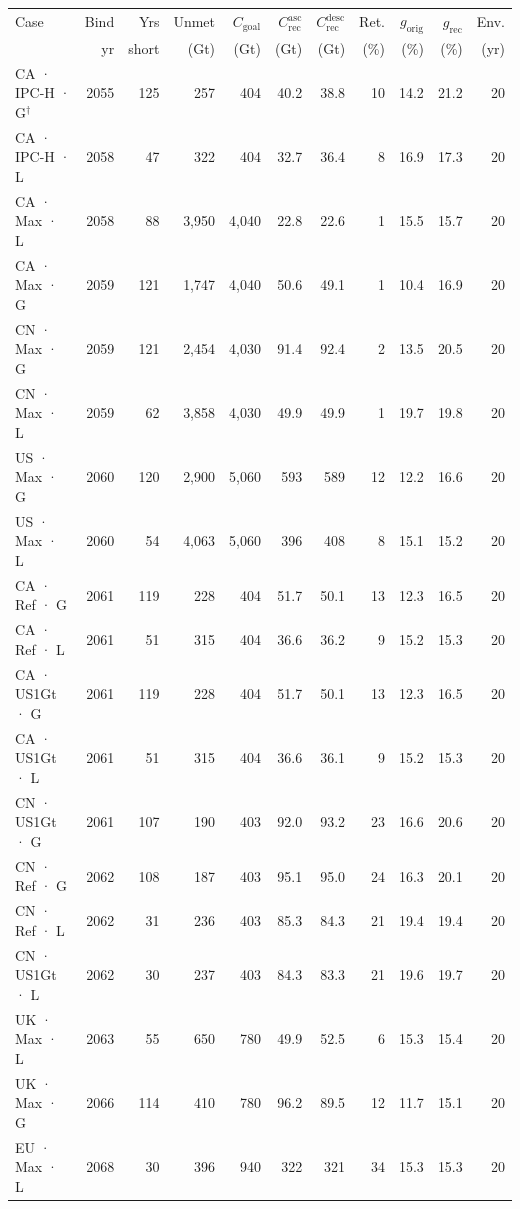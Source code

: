 \begin{tabular}{lrrrrrrrrrr}
Case & Bind & Yrs & Unmet & $C_{\mathrm{goal}}$ & $C_{\mathrm{rec}}^{\mathrm{asc}}$ & $C_{\mathrm{rec}}^{\mathrm{desc}}$ & Ret. & $g_{\mathrm{orig}}$ & $g_{\mathrm{rec}}$ & Env. \\
 & yr & short & (Gt) & (Gt) & (Gt) & (Gt) & (\%) & (\%) & (\%) & (yr) \\
\midrule
CA · IPC-H · G$^{\dagger}$ & 2055 & 125 & 257 & 404 & 40.2 & 38.8 & 10 & 14.2 & 21.2 & 20 \\
CA · IPC-H · L & 2058 & 47 & 322 & 404 & 32.7 & 36.4 & 8 & 16.9 & 17.3 & 20 \\
CA · Max · L & 2058 & 88 & 3,950 & 4,040 & 22.8 & 22.6 & 1 & 15.5 & 15.7 & 20 \\
CA · Max · G & 2059 & 121 & 1,747 & 4,040 & 50.6 & 49.1 & 1 & 10.4 & 16.9 & 20 \\
CN · Max · G & 2059 & 121 & 2,454 & 4,030 & 91.4 & 92.4 & 2 & 13.5 & 20.5 & 20 \\
CN · Max · L & 2059 & 62 & 3,858 & 4,030 & 49.9 & 49.9 & 1 & 19.7 & 19.8 & 20 \\
US · Max · G & 2060 & 120 & 2,900 & 5,060 & 593 & 589 & 12 & 12.2 & 16.6 & 20 \\
US · Max · L & 2060 & 54 & 4,063 & 5,060 & 396 & 408 & 8 & 15.1 & 15.2 & 20 \\
CA · Ref · G & 2061 & 119 & 228 & 404 & 51.7 & 50.1 & 13 & 12.3 & 16.5 & 20 \\
CA · Ref · L & 2061 & 51 & 315 & 404 & 36.6 & 36.2 & 9 & 15.2 & 15.3 & 20 \\
CA · US1Gt · G & 2061 & 119 & 228 & 404 & 51.7 & 50.1 & 13 & 12.3 & 16.5 & 20 \\
CA · US1Gt · L & 2061 & 51 & 315 & 404 & 36.6 & 36.1 & 9 & 15.2 & 15.3 & 20 \\
CN · US1Gt · G & 2061 & 107 & 190 & 403 & 92.0 & 93.2 & 23 & 16.6 & 20.6 & 20 \\
CN · Ref · G & 2062 & 108 & 187 & 403 & 95.1 & 95.0 & 24 & 16.3 & 20.1 & 20 \\
CN · Ref · L & 2062 & 31 & 236 & 403 & 85.3 & 84.3 & 21 & 19.4 & 19.4 & 20 \\
CN · US1Gt · L & 2062 & 30 & 237 & 403 & 84.3 & 83.3 & 21 & 19.6 & 19.7 & 20 \\
UK · Max · L & 2063 & 55 & 650 & 780 & 49.9 & 52.5 & 6 & 15.3 & 15.4 & 20 \\
UK · Max · G & 2066 & 114 & 410 & 780 & 96.2 & 89.5 & 12 & 11.7 & 15.1 & 20 \\
EU · Max · L & 2068 & 30 & 396 & 940 & 322 & 321 & 34 & 15.3 & 15.3 & 20 \\

\end{tabular}
